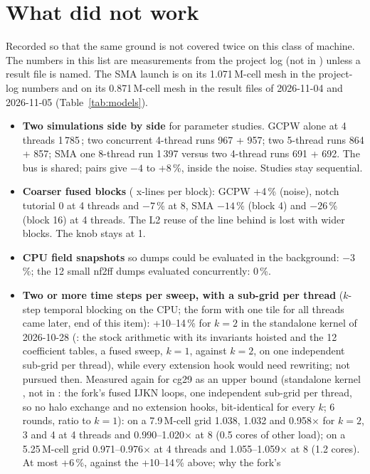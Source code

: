 \section{What did not work}\label{sec:rejected}
Recorded so that the same ground is not covered twice on this class of machine. The numbers in this list are
measurements from the project log (not in ) unless a result file is named. The SMA launch is on its
1.071\,M-cell mesh in the project-log numbers and on its 0.871\,M-cell mesh in the result files of 2026-11-04 and
2026-11-05 (Table~\ref{tab:models}).
\begin{itemize}
\item \textbf{Two simulations side by side} for parameter studies. GCPW alone at 4 threads 1\,785\,\MC; two concurrent
  4-thread runs 967 + 957; two 5-thread runs 864 + 857; SMA one 8-thread run 1\,397 versus two 4-thread runs 691 + 692.
  The bus is shared; pairs give $-4$ to +8\,\%, inside the noise. Studies stay sequential.
\item \textbf{Coarser fused blocks} ( x-lines per block): GCPW +4\,\% (noise), notch
  tutorial 0 at 4 threads and $-7$\,\% at 8, SMA $-14$\,\% (block 4) and $-26$\,\% (block 16) at 4 threads. The L2
  reuse of the line behind is lost with wider blocks. The knob stays at 1.
\item \textbf{CPU field snapshots} so dumps could be evaluated in the background: $-3$\,\%; the 12 small nf2ff dumps
  evaluated concurrently: 0\,\%.
\item \textbf{Two or more time steps per sweep, with a sub-grid per thread} ($k$-step temporal blocking on the CPU;
  the form with one tile for all threads came later, end of this item): +10--14\,\% for $k=2$ in the
  standalone kernel of 2026-10-28 (: the stock arithmetic with its invariants hoisted
  and the 12 coefficient tables, a fused sweep, $k=1$, against $k=2$, on one independent sub-grid per thread), while
  every extension hook would need rewriting; not pursued then.
  Measured again for cg29 as an upper bound (standalone kernel , not in : the fork's
  fused IJKN loops, one independent sub-grid per thread, so no halo exchange and no extension hooks, bit-identical for
  every $k$; 6 rounds, ratio to $k=1$): on a 7.9\,M-cell grid 1.038, 1.032 and 0.958$\times$ for $k=2$, 3 and 4 at 4
  threads and 0.990--1.020$\times$ at 8 (0.5 cores of other load); on a 5.25\,M-cell grid 0.971--0.976$\times$ at 4
  threads and 1.055--1.059$\times$ at 8 (1.2 cores). At most +6\,\%, against the +10--14\,\% above; why the fork's

\end{itemize}
